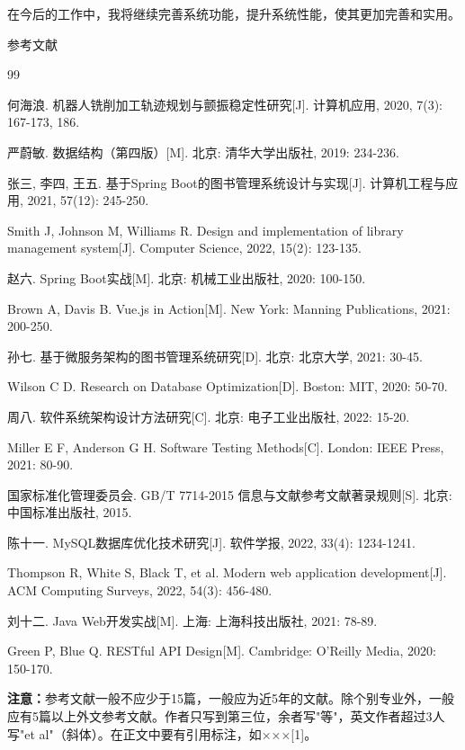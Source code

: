 \documentclass[a4paper,12pt,openany,twoside]{ctexbook}
\begin{document}
在今后的工作中，我将继续完善系统功能，提升系统性能，使其更加完善和实用。


\clearpage
{}
{}

\begin{center}
    {\heiti{}参考文献}
\end{center}

\vspace{\baselineskip}  %

{\songti{}\setlength{\baselineskip}{20pt}
\begin{thebibliography}{99}

何海浪. 机器人铣削加工轨迹规划与颤振稳定性研究[J]. 计算机应用, 2020, 7(3): 167-173, 186.

严蔚敏. 数据结构（第四版）[M]. 北京: 清华大学出版社, 2019: 234-236.

张三, 李四, 王五. 基于Spring Boot的图书管理系统设计与实现[J]. 计算机工程与应用, 2021, 57(12): 245-250.

Smith J, Johnson M, Williams R. Design and implementation of library management system[J]. Computer Science, 2022, 15(2): 123-135.

赵六. Spring Boot实战[M]. 北京: 机械工业出版社, 2020: 100-150.

Brown A, Davis B. Vue.js in Action[M]. New York: Manning Publications, 2021: 200-250.

孙七. 基于微服务架构的图书管理系统研究[D]. 北京: 北京大学, 2021: 30-45.

Wilson C D. Research on Database Optimization[D]. Boston: MIT, 2020: 50-70.

周八. 软件系统架构设计方法研究[C]. 北京: 电子工业出版社, 2022: 15-20.

Miller E F, Anderson G H. Software Testing Methods[C]. London: IEEE Press, 2021: 80-90.

国家标准化管理委员会. GB/T 7714-2015 信息与文献参考文献著录规则[S]. 北京: 中国标准出版社, 2015.

陈十一. MySQL数据库优化技术研究[J]. 软件学报, 2022, 33(4): 1234-1241.

Thompson R, White S, Black T, et al. Modern web application development[J]. ACM Computing Surveys, 2022, 54(3): 456-480.

刘十二. Java Web开发实战[M]. 上海: 上海科技出版社, 2021: 78-89.

Green P, Blue Q. RESTful API Design[M]. Cambridge: O'Reilly Media, 2020: 150-170.

\end{thebibliography}

\textbf{注意：}参考文献一般不应少于15篇，一般应为近5年的文献。除个别专业外，一般应有5篇以上外文参考文献。作者只写到第三位，余者写"等"，英文作者超过3人写"et al"（斜体）。在正文中要有引用标注，如×××[1]。

}
\end{document}
